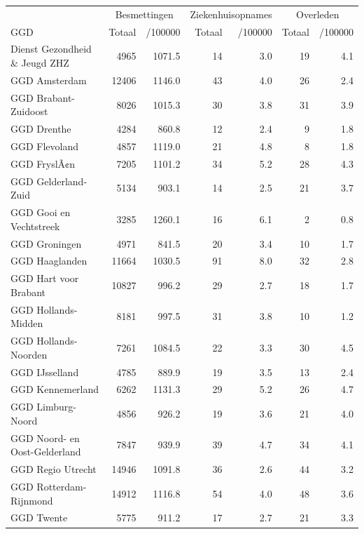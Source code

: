 \documentclass[
  english,
  man,floatsintext]{apa6}
\begin{document}
\begin{table}
\centering\begingroup\fontsize{10}{12}\selectfont

\begin{threeparttable}
\begin{tabular}{lrrrrrr}
\toprule
\multicolumn{1}{c}{ } & \multicolumn{2}{c}{Besmettingen} & \multicolumn{2}{c}{Ziekenhuisopnames} & \multicolumn{2}{c}{Overleden} \\
\cmidrule(l{3pt}r{3pt}){2-3} \cmidrule(l{3pt}r{3pt}){4-5} \cmidrule(l{3pt}r{3pt}){6-7}
GGD & Totaal & /100000 & Totaal & /100000 & Totaal & /100000\\
\midrule
Dienst Gezondheid \& Jeugd ZHZ & 4965 & 1071.5 & 14 & 3.0 & 19 & 4.1\\
GGD Amsterdam & 12406 & 1146.0 & 43 & 4.0 & 26 & 2.4\\
GGD Brabant-Zuidoost & 8026 & 1015.3 & 30 & 3.8 & 31 & 3.9\\
GGD Drenthe & 4284 & 860.8 & 12 & 2.4 & 9 & 1.8\\
GGD Flevoland & 4857 & 1119.0 & 21 & 4.8 & 8 & 1.8\\
GGD FryslÃ¢n & 7205 & 1101.2 & 34 & 5.2 & 28 & 4.3\\
GGD Gelderland-Zuid & 5134 & 903.1 & 14 & 2.5 & 21 & 3.7\\
GGD Gooi en Vechtstreek & 3285 & 1260.1 & 16 & 6.1 & 2 & 0.8\\
GGD Groningen & 4971 & 841.5 & 20 & 3.4 & 10 & 1.7\\
GGD Haaglanden & 11664 & 1030.5 & 91 & 8.0 & 32 & 2.8\\
GGD Hart voor Brabant & 10827 & 996.2 & 29 & 2.7 & 18 & 1.7\\
GGD Hollands-Midden & 8181 & 997.5 & 31 & 3.8 & 10 & 1.2\\
GGD Hollands-Noorden & 7261 & 1084.5 & 22 & 3.3 & 30 & 4.5\\
GGD IJsselland & 4785 & 889.9 & 19 & 3.5 & 13 & 2.4\\
GGD Kennemerland & 6262 & 1131.3 & 29 & 5.2 & 26 & 4.7\\
GGD Limburg-Noord & 4856 & 926.2 & 19 & 3.6 & 21 & 4.0\\
GGD Noord- en Oost-Gelderland & 7847 & 939.9 & 39 & 4.7 & 34 & 4.1\\
GGD Regio Utrecht & 14946 & 1091.8 & 36 & 2.6 & 44 & 3.2\\
GGD Rotterdam-Rijnmond & 14912 & 1116.8 & 54 & 4.0 & 48 & 3.6\\
GGD Twente & 5775 & 911.2 & 17 & 2.7 & 21 & 3.3\\

\end{tabular}
\end{threeparttable}
\end{table}
\end{document}
